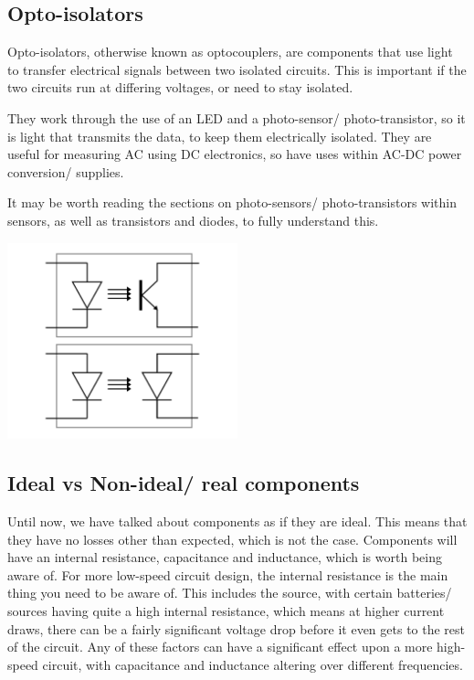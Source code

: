 \documentclass[a4paper,11pt]{report}
\begin{document}
\subsection{Opto-isolators}

Opto-isolators, otherwise known as optocouplers, are components that use light to transfer electrical signals between two isolated circuits. This is important if the two circuits run at differing voltages, or need to stay isolated.

They work through the use of an LED and a photo-sensor/ photo-transistor, so it is light that transmits the data, to keep them electrically isolated. They are useful for measuring AC using DC electronics, so have uses within AC-DC power conversion/ supplies.

It may be worth reading the sections on photo-sensors/ photo-transistors within sensors, as well as transistors and diodes, to fully understand this.

\includegraphics[width=0.5\textwidth]{optoisolator1}

\subsection{Ideal vs Non-ideal/ real components}

Until now, we have talked about components as if they are ideal. This means that they have no losses other than expected, which is not the case. Components will have an internal resistance, capacitance and inductance, which is worth being aware of. For more low-speed circuit design, the internal resistance is the main thing you need to be aware of. This includes the source, with certain batteries/ sources having quite a high internal resistance, which means at higher current draws, there can be a fairly significant voltage drop before it even gets to the rest of the circuit. Any of these factors can have a significant effect upon a more high-speed circuit, with capacitance and inductance altering over different frequencies.
\end{document}
